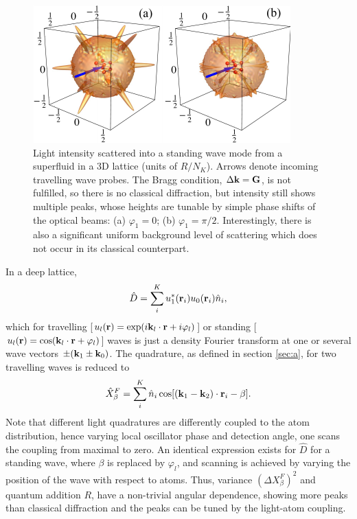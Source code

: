 \begin{figure}[htbp!]
  \centering
  \includegraphics[width=\linewidth]{Ep1}
  \caption[Light Scattering Angular Distribution]{Light intensity
    scattered into a standing wave mode from a superfluid in a 3D
    lattice (units of $R/N_K$). Arrows denote incoming travelling wave
    probes. The Bragg condition, $\Delta \mathbf{k} = \mathbf{G}$, is not
    fulfilled, so there is no classical diffraction, but intensity
    still shows multiple peaks, whose heights are tunable by simple
    phase shifts of the optical beams: (a) $\varphi_1=0$; (b)
    $\varphi_1=\pi/2$. Interestingly, there is also a significant
    uniform background level of scattering which does not occur in its
    classical counterpart. }
  \label{fig:Scattering}
\end{figure}

In a deep lattice,
\begin{equation} 
  \hat{D}=\sum_i^K u_1^*({\bf r}_i) u_0({\bf r}_i) \hat{n}_i,
\end{equation} 
which for travelling
[$u_l(\mathbf{r})=\exp(i \mathbf{k}_l \cdot \mathbf{r}+i\varphi_l)$] or standing
[$u_l(\mathbf{r})=\cos(\mathbf{k}_l \cdot \mathbf{r}+\varphi_l)$] waves is just a
density Fourier transform at one or several wave vectors
$\pm(\mathbf{k}_1 \pm \mathbf{k}_0)$. The quadrature, as defined in section
\ref{sec:a}, for two travelling waves is reduced to
\begin{equation} 
  \hat{X}^F_\beta = \sum_i^K \hat{n}_i\cos[(\mathbf{k}_1 - \mathbf{k}_2) \cdot
  \mathbf{r}_i - \beta].
\end{equation} 
Note that different light quadratures are differently coupled to the
atom distribution, hence varying local oscillator phase and detection
angle, one scans the coupling from maximal to zero. An identical
expression exists for $\hat{D}$ for a standing wave, where $\beta$ is
replaced by $\varphi_l$, and scanning is achieved by varying the
position of the wave with respect to atoms. Thus, variance
$(\Delta X^F_\beta)^2$ and quantum addition $R$, have a non-trivial
angular dependence, showing more peaks than classical diffraction and
the peaks can be tuned by the light-atom coupling.

